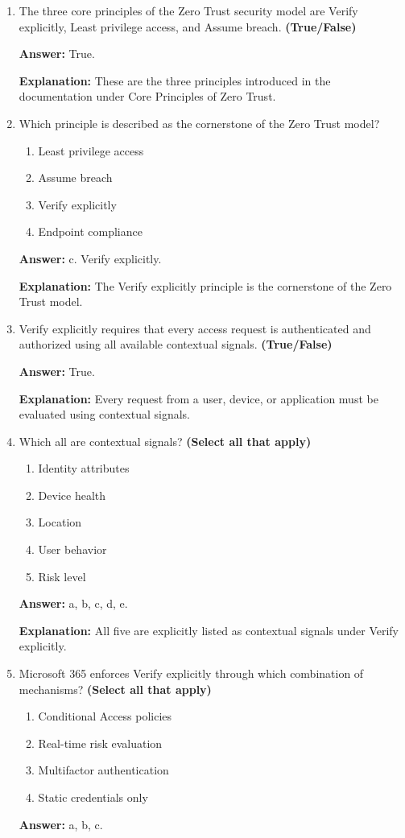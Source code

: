 \documentclass[10pt]{article}
\begin{document}
\begin{enumerate}[leftmargin=*]
\textbf{Explanation:} These four reasons in the Zero Trust conversation diagram.\\

\item The three core principles of the Zero Trust security model are Verify explicitly, Least privilege access, and Assume breach. \textbf{(True/False)}

\textbf{Answer:} True.

\textbf{Explanation:} These are the three principles introduced in the documentation under Core Principles of Zero Trust.

\item Which principle is described as the cornerstone of the Zero Trust model?
\begin{enumerate}[label=\alph*., leftmargin=1.5em]
\item Least privilege access
\item Assume breach
\item Verify explicitly
\item Endpoint compliance
\end{enumerate}
\textbf{Answer:} c. Verify explicitly.

\textbf{Explanation:} The Verify explicitly principle is the cornerstone of the Zero Trust model.

\item Verify explicitly requires that every access request is authenticated and authorized using all available contextual signals. \textbf{(True/False)}

\textbf{Answer:} True.

\textbf{Explanation:} Every request from a user, device, or application must be evaluated using contextual signals.

\item Which all are contextual signals? \textbf{(Select all that apply)}
\begin{enumerate}[label=\alph*., leftmargin=1.5em]
\item Identity attributes
\item Device health
\item Location
\item User behavior
\item Risk level
\end{enumerate}
\textbf{Answer:} a, b, c, d, e.

\textbf{Explanation:} All five are explicitly listed as contextual signals under Verify explicitly.

\item Microsoft 365 enforces Verify explicitly through which combination of mechanisms? \textbf{(Select all that apply)}
\begin{enumerate}[label=\alph*., leftmargin=1.5em]
\item Conditional Access policies
\item Real-time risk evaluation
\item Multifactor authentication
\item Static credentials only
\end{enumerate}
\textbf{Answer:} a, b, c.


\end{enumerate}
\end{document}
